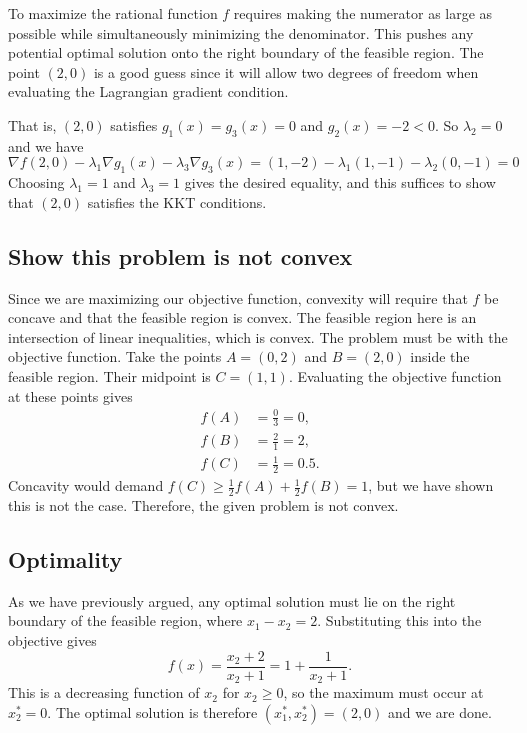 \documentclass[11pt]{article}
\theoremstyle{problemstyle}
\begin{document}
To maximize the rational function $f$ requires making the numerator as large as
possible while simultaneously minimizing the denominator. This pushes any
potential optimal solution onto the right boundary of the feasible region. The
point $(2,0)$ is a good guess since it will allow two degrees of freedom when
evaluating the Lagrangian gradient condition.

That is, \((2,0)\) satisfies \(g_1(x)=g_3(x)=0\) and \(g_2(x)=-2<0\). So
$\lambda_2=0$ and we have
\[
  \nabla f(2,0)-\lambda_1\nabla g_1(x) -\lambda_3\nabla g_3(x)
  =(1,-2)-\lambda_1(1,-1)-\lambda_2(0,-1) = 0
\]
Choosing $\lambda_1=1$ and $\lambda_3=1$ gives the desired equality, and this
suffices to show that $(2,0)$ satisfies the KKT conditions.

\subsection*{Show this problem is not convex}

Since we are maximizing our objective function, convexity will require that $f$
be concave and that the feasible region is convex. The feasible region here is
an intersection of linear inequalities, which is convex. The problem must be
with the objective function.
Take the points \(A=(0,2)\) and \(B=(2,0)\) inside the feasible region. Their
midpoint is \(C=(1,1)\). Evaluating the objective function at these points gives
\begin{align*}
  f(A)&=\frac{0}{3}=0,\\
  f(B)&=\frac{2}{1}=2,\\
  f(C)&=\frac{1}{2}=0.5.
\end{align*}
Concavity would demand
\(f(C)\ge\frac12f(A)+\frac12f(B)=1\), but we have shown this is not the case.
Therefore, the given problem is not convex.

\subsection*{Optimality}

As we have previously argued, any optimal solution must lie on the right
boundary of the feasible region, where $x_1-x_2=2$. Substituting this into the
objective gives
\[
f(x)=\frac{x_2+2}{x_2+1}=1+\frac{1}{x_2+1}.
\]
This is a decreasing function of $x_2$ for $x_2\ge0$, so the maximum must occur
at $x_2^*=0$. The optimal solution is therefore $(x_1^*,x_2^*)=(2,0)$ and we are
done.
\end{document}
